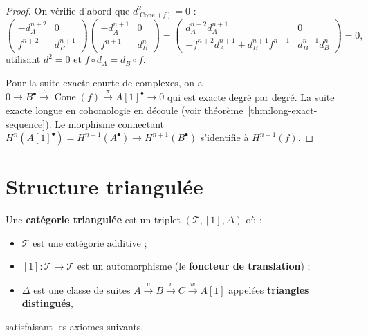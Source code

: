 \begin{proof}
On vérifie d'abord que $d_{\operatorname{Cone}(f)}^2 = 0$ :
\[
  \begin{pmatrix} -d_A^{n+2} & 0 \\ f^{n+2} & d_B^{n+1} \end{pmatrix}
  \begin{pmatrix} -d_A^{n+1} & 0 \\ f^{n+1} & d_B^n \end{pmatrix}
  = \begin{pmatrix} d_A^{n+2} d_A^{n+1} & 0 \\
    -f^{n+2} d_A^{n+1} + d_B^{n+1} f^{n+1} & d_B^{n+1} d_B^n \end{pmatrix}
  = 0,
\]
utilisant $d^2 = 0$ et $f \circ d_A = d_B \circ f$.

Pour la suite exacte courte de complexes, on a
$0 \to B^\bullet \xrightarrow{\iota} \operatorname{Cone}(f) \xrightarrow{\pi} A[1]^\bullet \to 0$
qui est exacte degré par degré. La suite exacte longue en cohomologie
en découle (voir théorème~\ref{thm:long-exact-sequence}).
Le morphisme connectant $H^n(A[1]^\bullet) = H^{n+1}(A^\bullet) \to H^{n+1}(B^\bullet)$
s'identifie à $H^{n+1}(f)$.
\end{proof}


\section{Structure triangulée}\label{sec:triangulated}

\begin{definition}\label{def:triangulated}
Une \textbf{catégorie triangulée} est un triplet
$(\mathcal{T}, [1], \Delta)$ où :
\begin{itemize}
\item $\mathcal{T}$ est une catégorie additive ;
\item $[1] \colon \mathcal{T} \to \mathcal{T}$ est un automorphisme
  (le \textbf{foncteur de translation}) ;
\item $\Delta$ est une classe de suites
  $A \xrightarrow{u} B \xrightarrow{v} C \xrightarrow{w} A[1]$
  appelées \textbf{triangles distingués},
\end{itemize}
satisfaisant les axiomes suivants.
\end{definition}

